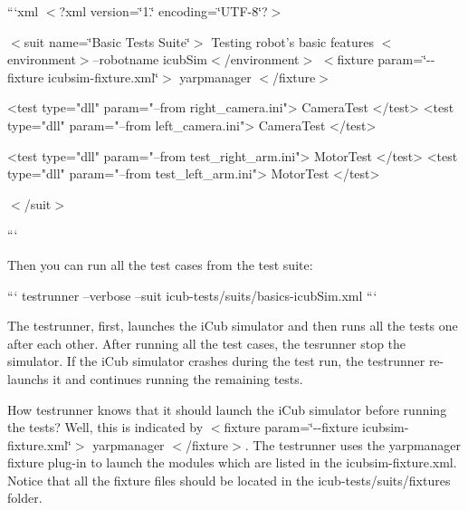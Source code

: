 ```xml $<$?xml version=\char`\"{}1.\char`\"{} encoding=\char`\"{}\-U\-T\-F-\/8\char`\"{}?$>$

$<$suit name=\char`\"{}\-Basic Tests Suite\char`\"{}$>$ Testing robot's basic features $<$environment$>$--robotname icub\-Sim$<$/environment$>$ $<$fixture param=\char`\"{}-\/-\/fixture icubsim-\/fixture.\-xml\char`\"{}$>$ yarpmanager $<$/fixture$>$

\begin{DoxyVerb}<test type="dll" param="--from right_camera.ini"> CameraTest </test>
<test type="dll" param="--from left_camera.ini"> CameraTest </test> 


<test type="dll" param="--from test_right_arm.ini"> MotorTest </test>
<test type="dll" param="--from test_left_arm.ini"> MotorTest </test>
\end{DoxyVerb}
 $<$/suit$>$

```

Then you can run all the test cases from the test suite\-:

``` testrunner --verbose --suit icub-\/tests/suits/basics-\/icub\-Sim.\-xml ```

The {\ttfamily testrunner}, first, launches the i\-Cub simulator and then runs all the tests one after each other. After running all the test cases, the {\ttfamily tesrunner} stop the simulator. If the i\-Cub simulator crashes during the test run, the {\ttfamily testrunner} re-\/launchs it and continues running the remaining tests.

How {\ttfamily testrunner} knows that it should launch the i\-Cub simulator before running the tests? Well, this is indicated by {\ttfamily $<$fixture param=\char`\"{}-\/-\/fixture icubsim-\/fixture.\-xml\char`\"{}$>$ yarpmanager $<$/fixture$>$}. The {\ttfamily testrunner} uses the {\ttfamily yarpmanager} fixture plug-\/in to launch the modules which are listed in the {\ttfamily icubsim-\/fixture.\-xml}. Notice that all the fixture files should be located in the {\ttfamily icub-\/tests/suits/fixtures} folder. 